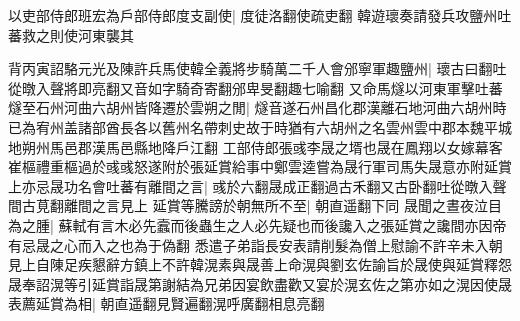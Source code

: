 以吏部侍郎班宏為戶部侍郎度支副使|{
	度徒洛翻使疏吏翻}
韓遊瓌奏請發兵攻鹽州吐蕃救之則使河東襲其

背丙寅詔駱元光及陳許兵馬使韓全義將步騎萬二千人會邠寧軍趣鹽州|{
	瓌古曰翻吐從暾入聲將即亮翻又音如字騎奇寄翻邠卑旻翻趣七喻翻}
又命馬燧以河東軍擊吐蕃燧至石州河曲六胡州皆降遷於雲朔之閒|{
	燧音遂石州昌化郡漢離石地河曲六胡州時已為宥州盖諸部酋長各以舊州名帶刺史故于時猶有六胡州之名雲州雲中郡本魏平城地朔州馬邑郡漢馬邑縣地降戶江翻}
工部侍郎張彧李晟之壻也晟在鳳翔以女嫁幕客崔樞禮重樞過於彧彧怒遂附於張延賞給事中鄭雲逵嘗為晟行軍司馬失晟意亦附延賞上亦忌晟功名會吐蕃有離間之言|{
	彧於六翻晟成正翻過古禾翻又古卧翻吐從暾入聲間古莧翻離間之言見上}
延賞等騰謗於朝無所不至|{
	朝直遥翻下同}
晟聞之晝夜泣目為之腫|{
	蘇軾有言木必先蠧而後蟲生之人必先疑也而後讒入之張延賞之讒間亦因帝有忌晟之心而入之也為于偽翻}
悉遣子弟詣長安表請削髮為僧上慰諭不許辛未入朝見上自陳足疾懇辭方鎮上不許韓滉素與晟善上命滉與劉玄佐諭旨於晟使與延賞釋怨晟奉詔滉等引延賞詣晟第謝結為兄弟因宴飲盡歡又宴於滉玄佐之第亦如之滉因使晟表薦延賞為相|{
	朝直遥翻見賢遍翻滉呼廣翻相息亮翻}


